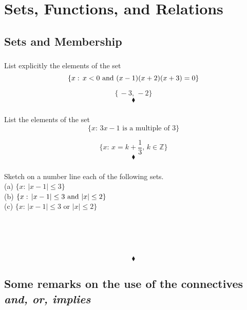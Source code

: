 \chapter{Sets, Functions, and Relations}
\pagebreak[4]

\section{Sets and Membership }
\subsection{}
\begin{tcolorbox}
List explicitly the elements of the set 
$$\{x:\,x<0 \text{ and } (x-1)(x+2)(x+3)=0\}$$
\end{tcolorbox}
$$\{\,-3,\, -2\}$$
$$\blacklozenge$$

\subsection{}
\begin{tcolorbox}
List the elements of the set 
$$\{x:\,3x-1  \text{ is a multiple of  } 3\}$$
\end{tcolorbox}
$$\{x:\,x= k+\frac{1}{3},\, k\in \mathbb{Z}\}$$
$$\blacklozenge$$
\subsection{}
\begin{tcolorbox}
Sketch on a number line each of the following sets.\\
(a) $\{x:\,|x-1| \leq 3  \}$\\
(b) $\{x:\,|x-1| \leq 3 \text{ and } |x| \leq 2 \}$\\
(c) $\{x:\,|x-1| \leq 3 \text{ or } |x| \leq 2 \}$
\end{tcolorbox}
\begin{figure}[H]%
    \centering
    \subfloat[]{}\\
    \subfloat[]{}\\
    \subfloat[]{}\\
\label{fig:fig_p3}
\end{figure}
$$\blacklozenge$$
\newpage
\section{Some remarks on the use of the connectives \textit{and, or, implies}}
